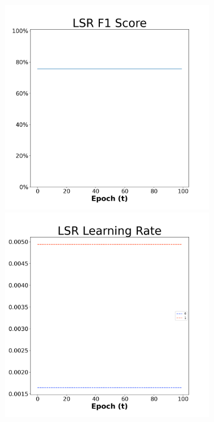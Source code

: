 \begin{figure}[H]
    \centering %
\begin{subfigure}{0.3\textwidth}
  \includegraphics[width=\linewidth]{images/exper2/NSP/LSR_0.01_f1.png}
    \includegraphics[width=\linewidth]{images/exper2/NSP/LSR_0.01_lr.png}

\end{subfigure}
\end{figure}
